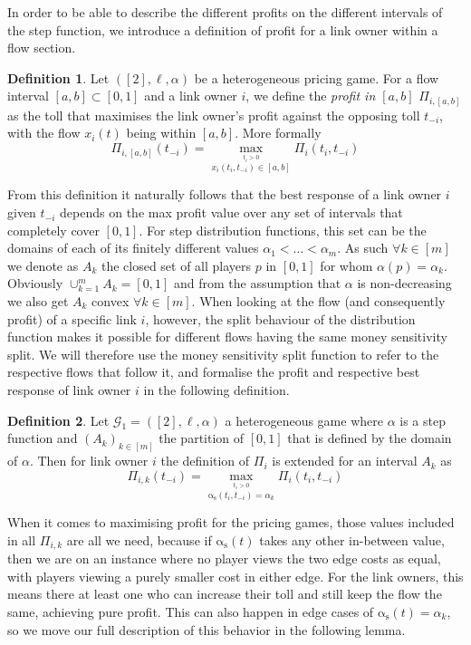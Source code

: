 \documentclass[10pt,a4paper]{book}
\newcommand{\as}{\mathrm{\alpha_s}}
\newcommand{\Gm}{\mathcal{G}}
\DeclareMathOperator*{\argmax}{arg\,max}
\theoremstyle{definition}
\newtheorem{definition}{Definition}[chapter]
\theoremstyle{comment}
\begin{document}
In order to be able to describe the different profits on the different intervals of the step function, we introduce a definition of profit for a link owner within a flow section.

\begin{definition}
	\label{definition:profit_interval}
	Let $([2], \ell, \alpha)$ be a heterogeneous pricing game.
	For a flow interval $[a, b] \subset [0, 1]$ and a link owner $i$, we define the \textit{profit in $[a, b]$} $\Pi_{i, [a, b]}$ as the toll that maximises the link owner's profit against the opposing toll $t_{-i}$, with the flow $x_i(t)$ being within $[a, b]$.
	More formally
	\[
		\Pi_{i, [a, b]}(t_{-i}) = \max_{\stackrel{t_i > 0}{x_i(t_i, t_{-i}) \in [a, b]}}\Pi_i(t_i, t_{-i})
	\]
\end{definition}

From this definition it naturally follows that the best response of a link owner $i$ given $t_{-i}$ depends on the max profit value over any set of intervals that completely cover $[0, 1]$.
For step distribution functions, this set can be the domains of each of its finitely different values $\alpha_1 < \ldots < \alpha_m$.
As such $\forall k \in [m]$ we denote as $A_k$ the closed set of all players $p$ in $[0, 1]$ for whom $\alpha(p) = \alpha_k$.
Obviously $\cup_{k=1}^m A_k = [0, 1]$ and from the assumption that $\alpha$ is non-decreasing we also get $A_k$ convex $\forall k \in [m]$.
When looking at the flow (and consequently profit) of a specific link $i$, however, the split behaviour of the distribution function makes it possible for different flows having the same money sensitivity split.
We will therefore use the money sensitivity split function to refer to the respective flows that follow it, and formalise the profit and respective best response of link owner $i$ in the following definition.

\begin{definition}
	Let $\Gm_1 = ([2], \ell, \alpha)$ a heterogeneous game where $\alpha$ is a step function and $(A_k)_{k \in [m]}$ the partition of $[0, 1]$ that is defined by the domain of $\alpha$.
	Then for link owner $i$ the definition of $\Pi_i$ is extended for an interval $A_k$ as
	\[
		\Pi_{i, k}(t_{-i}) = \max_{\stackrel{t_i > 0}{\as(t_i, t_{-i}) = \alpha_k}}\Pi_i(t_i, t_{-i})
	\]
\end{definition}

When it comes to maximising profit for the pricing games, those values included in all $\Pi_{i, k}$ are all we need, because if $\as(t)$ takes any other in-between value, then we are on an instance where no player views the two edge costs as equal, with players viewing a purely smaller cost in either edge.
For the link owners, this means there at least one who can increase their toll and still keep the flow the same, achieving pure profit.
This can also happen in edge cases of $\as(t) = \alpha_k$, so we move our full description of this behavior in the following lemma.
\end{document}
